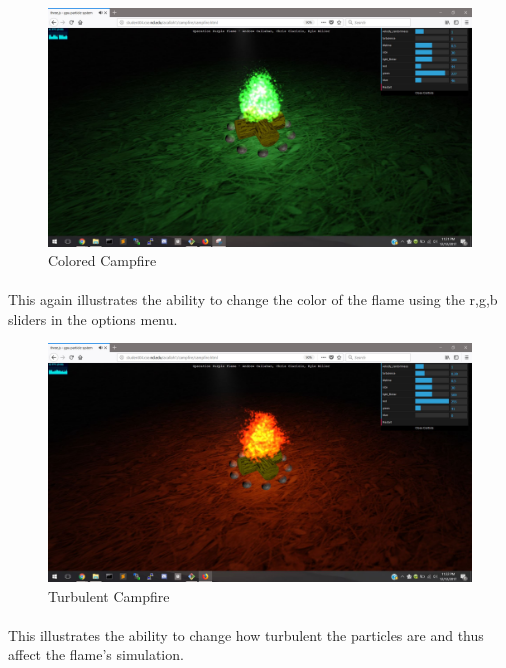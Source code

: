 \documentclass[letterpaper]{article}
\begin{document}
\begin{figure}[H]
\centering
\includegraphics[scale=.35]{result5.JPG}
\caption{Colored Campfire}
\label{fig:result5}
\end{figure}
\paragraph{}
This again illustrates the ability to change the color of the flame using the r,g,b sliders in the options menu.

\begin{figure}[H]
\centering
\includegraphics[scale=.35]{result6.JPG}
\caption{Turbulent Campfire}
\label{fig:result6}
\end{figure}
\paragraph{}
This illustrates the ability to change how turbulent the particles are and thus affect the flame's simulation.
\end{document}
